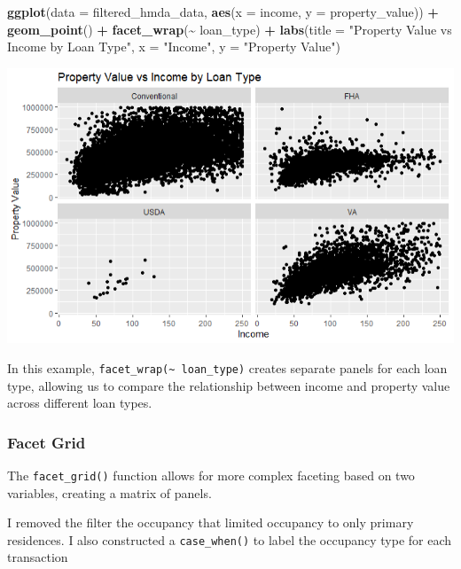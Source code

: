 \documentclass[
]{book}
\newenvironment{Shaded}{\begin{snugshade}}{\end{snugshade}}
\newcommand{\AttributeTok}[1]{\textcolor[rgb]{0.13,0.29,0.53}{#1}}
\newcommand{\FunctionTok}[1]{\textcolor[rgb]{0.13,0.29,0.53}{\textbf{#1}}}
\newcommand{\NormalTok}[1]{#1}
\newcommand{\SpecialCharTok}[1]{\textcolor[rgb]{0.81,0.36,0.00}{\textbf{#1}}}
\newcommand{\StringTok}[1]{\textcolor[rgb]{0.31,0.60,0.02}{#1}}
\begin{document}
\begin{Shaded}
\begin{Highlighting}[]
\FunctionTok{ggplot}\NormalTok{(}\AttributeTok{data =}\NormalTok{ filtered\_hmda\_data, }\FunctionTok{aes}\NormalTok{(}\AttributeTok{x =}\NormalTok{ income, }\AttributeTok{y =}\NormalTok{ property\_value)) }\SpecialCharTok{+}
  \FunctionTok{geom\_point}\NormalTok{() }\SpecialCharTok{+}
  \FunctionTok{facet\_wrap}\NormalTok{(}\SpecialCharTok{\textasciitilde{}}\NormalTok{ loan\_type) }\SpecialCharTok{+}
  \FunctionTok{labs}\NormalTok{(}\AttributeTok{title =} \StringTok{"Property Value vs Income by Loan Type"}\NormalTok{,}
       \AttributeTok{x =} \StringTok{"Income"}\NormalTok{,}
       \AttributeTok{y =} \StringTok{"Property Value"}\NormalTok{)}
\end{Highlighting}
\end{Shaded}

\includegraphics{images/facet_wrap.PNG}

In this example, \texttt{facet\_wrap(\textasciitilde{}\ loan\_type)} creates separate panels for each loan type, allowing us to compare the relationship between income and property value across different loan types.

\hypertarget{facet-grid}{%
\subsubsection*{Facet Grid}\label{facet-grid}}

The \texttt{facet\_grid()} function allows for more complex faceting based on two variables, creating a matrix of panels.

I removed the filter the occupancy that limited occupancy to only primary residences. I also constructed a \texttt{case\_when()} to label the occupancy type for each transaction
\end{document}
